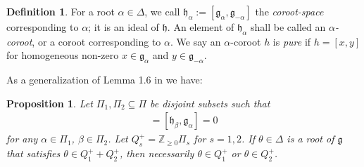 \documentclass[12pt, a4paper, reqno]{amsart}
\def\h{\mathfrak{h}}
\newtheorem{proposition}{Proposition}
\theoremstyle{definition}
\newtheorem{definition}{Definition}
\theoremstyle{definition}
\theoremstyle{definition}
\numberwithin{theorem}{section}
\numberwithin{lemma}{section}
\numberwithin{remark}{section}
\numberwithin{definition}{section}
\numberwithin{corollary}{section}
\numberwithin{proposition}{section}
\numberwithin{example}{section}
\begin{document}
	\begin{definition}\label{definition_coroot}
		For a root \(\alpha \in \Delta\), we call \(\h_{\alpha}:=[\mathfrak{g}_{\alpha},\mathfrak{g}_{-\alpha}]\) the \emph{coroot-space} corresponding to \(\alpha\); it is an ideal of \(\mathfrak{h}\). An element of $\h_{\alpha}$ shall be called an \emph{\(\alpha\)-coroot}, or a coroot corresponding to \(\alpha\). We say an \(\alpha\)-coroot \(h\) is \emph{pure} if \(h = [x,y]\) for homogeneous non-zero \(x \in \mathfrak{g}_{\alpha}\) and \(y \in \mathfrak{g}_{-\alpha}\).
	\end{definition}

	As a generalization of Lemma 1.6 in \cite{K} we have:

	\begin{proposition}\label{proposition-roots-connectivity}
	Let \(\Pi_1,\Pi_2 \subseteq \Pi\) be disjoint subsets such that
	\begin{align*}
		[\h_{\alpha},\mathfrak{g}_{\beta}] = [\h_{\beta},\mathfrak{g}_{\alpha}] = 0
	\end{align*} 
	for any \(\alpha \in \Pi_1\), \(\beta \in \Pi_2\). Let \(Q^+_s = \mathbb{Z}_{\geq 0}\Pi_s\) for \(s=1,2\). If \(\theta \in \Delta\) is a root of \(\mathfrak{g}\) that satisfies \(\theta \in Q^+_1 + Q^+_2\), then necessarily \(\theta \in Q^+_1\) or \(\theta \in Q^+_2\).
\end{proposition}
\end{document}

